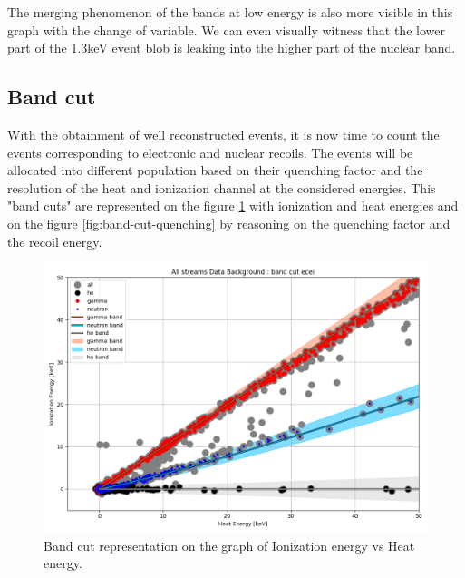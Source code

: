 The merging phenomenon of the bands at low energy is also more visible in this graph with the change of variable. We can even visually witness that the lower part of the 1.3keV event blob is leaking into the higher part of the nuclear band.


\subsection{Band cut}
\label{par:band-cut}

With the obtainment of well reconstructed events, it is now time to count the events corresponding to electronic and nuclear recoils. The events will be allocated into different population based on their quenching factor and the resolution of the heat and ionization channel at the considered energies. This "band cuts" are represented on the figure \ref{fig:band-cut-ecei} with ionization and heat energies and on the figure \ref{fig:band-cut-quenching} by reasoning on the quenching factor and the recoil energy.

\begin{figure}
\centering
\includegraphics[width=\linewidth,]{Figures/Neutron/band_cut_ecei.png}
\caption{Band cut representation on the graph of Ionization energy vs Heat energy.}
\label{fig:band-cut-ecei}
\end{figure}

